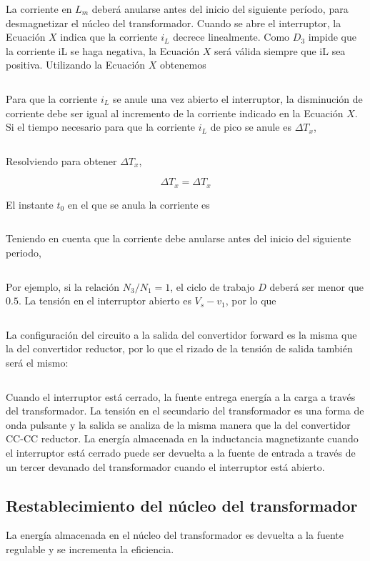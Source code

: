 $$  $$

La corriente en $L_m$ deberá anularse antes del inicio del siguiente período, para desmagnetizar
el núcleo del transformador. Cuando se abre el interruptor, la Ecuación $X$ indica que la corriente
$i_L$ decrece linealmente. Como $D_3$ impide que la corriente iL se haga negativa, la Ecuación
$X$ será válida siempre que iL sea positiva. Utilizando la Ecuación $X$ obtenemos

$$  $$

Para que la corriente $i_L$ se anule una vez abierto el interruptor, la disminución de corriente
debe ser igual al incremento de la corriente indicado en la Ecuación $X$. Si el tiempo necesario
para que la corriente $i_L$ de pico se anule es $\Delta T_x$, 

$$  $$

Resolviendo para obtener $\Delta T_x$,

$$ \Delta T_x=\Delta T_x $$

El instante $t_0$ en el que se anula la corriente es

$$  $$

Teniendo en cuenta que la corriente debe anularse antes del inicio del siguiente periodo,

$$  $$

Por ejemplo, si la relación $N_3/N_1 = 1$, el ciclo de trabajo $D$ deberá ser menor que $0.5$. La tensión
en el interruptor abierto es $V_s-v_1$, por lo que

$$  $$

La configuración del circuito a la salida del convertidor forward es la misma que la del convertidor
reductor, por lo que el rizado de la tensión de salida también será el mismo:

$$  $$

Cuando el interruptor está cerrado, la fuente entrega energía a la carga a través del transformador.
La tensión en el secundario del transformador es una forma de onda pulsante y la salida se
analiza de la misma manera que la del convertidor CC-CC reductor. La energía almacenada en
la inductancia magnetizante cuando el interruptor está cerrado puede ser devuelta a la fuente de
entrada a través de un tercer devanado del transformador cuando el interruptor está abierto.

\subsection{Restablecimiento del núcleo del transformador}
La energía almacenada en el núcleo del transformador es devuelta a la fuente regulable y se incrementa la eficiencia. 

